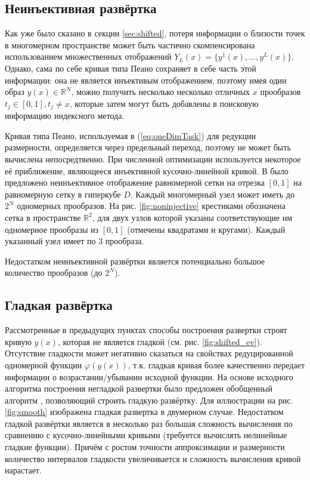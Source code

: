 \subsection{Неинъективная развёртка}

Как уже было сказано в секции \ref{sec:shifted}, потеря информации о близости точек в многомерном
пространстве может быть частично скомпенсирована использованием множественных отображений $Y_L(x)=\{y^1(x),...,y^L(x)\}$.
Однако, сама по себе кривая типа Пеано сохраняет в себе часть этой информации: она не является инъективым отображением,
поэтому имея один образ $y(x)\in \mathbb{R}^N$, можно получить несколько несколько отличных $x$ прообразов $t_j\in[0,1], t_j \not = x$,
которые затем могут быть добавлены в поисковую информацию индексного метода.

Кривая типа Пеано, используемая в (\ref{eq:oneDimTask}) для редукции размерности, определяется через предельный переход,
поэтому не может быть вычислена непосредтвенно. При численной оптимизации используется некоторое её приближение, являющееся
инъективной кусочно-линейной кривой. В \cite{strongin1978} было предложено неинъективное отображение равномерной сетки на
отрезка $[0,1]$ на равномерную сетку в гиперкубе $D$. Каждый многомерный узел может иметь до $2^N$ одномерных прообразов.
На рис. \ref{fig:noninjective} крестиками обозначена сетка в пространстве $\mathbb{R}^2$, для двух узлов которой
указаны соответствующие им одномерное прообразы из $[0,1]$ (отмечены квадратами и кругами). Каждый указанный узел имеет по 3 прообраза.

Недостатком неинъективной развёртки является потенциально большое количество прообразов (до $2^N$).


\subsection{Гладкая развёртка}

Рассмотренные в предыдущих пунктах способы построения развертки строят кривую $y(x)$, которая не является
гладкой (см. рис. \ref{fig:shifted_ev}). Отсутствие гладкости может негативно сказаться на свойствах редуцированной
одномерной функции $\varphi(y(x))$, т.к. гладкая кривая более качественно передает информации о возрастании/убывании
исходной функции. На основе исходного алгоритма построения негладкой развертки было предложен обобщенный алгоритм
\cite{Goryachih2017}, позволяющий строить гладкую развёртку. Для иллюстрации на рис. \ref{fig:smooth} изображена гладкая
развертка в двумерном случае. Недостатком гладкой развёртки является в несколько раз большая сложность вычисления по
сравнению с кусочно-линейными кривыми (требуется вычислять нелинейные гладкие функции). Причём с ростом точности аппроксимации и
размерности количество интервалов гладкости увеличивается и сложность вычисления кривой нарастает.

